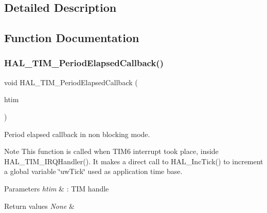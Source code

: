 \subsection{Detailed Description}


\subsection{Function Documentation}
\mbox{\label{group___t_i_m___exported___functions___group9_ga8a3b0ad512a6e6c6157440b68d395eac}} 
\subsubsection{\texorpdfstring{H\+A\+L\+\_\+\+T\+I\+M\+\_\+\+Period\+Elapsed\+Callback()}{HAL\_TIM\_PeriodElapsedCallback()}}
{\footnotesize\ttfamily void H\+A\+L\+\_\+\+T\+I\+M\+\_\+\+Period\+Elapsed\+Callback (\begin{DoxyParamCaption}\item[{\hyperlink{struct_t_i_m___handle_type_def}{T\+I\+M\+\_\+\+Handle\+Type\+Def} $\ast$}]{htim }\end{DoxyParamCaption})}



Period elapsed callback in non blocking mode. 

\begin{DoxyNote}{Note}
This function is called when T\+I\+M6 interrupt took place, inside H\+A\+L\+\_\+\+T\+I\+M\+\_\+\+I\+R\+Q\+Handler(). It makes a direct call to H\+A\+L\+\_\+\+Inc\+Tick() to increment a global variable \char`\"{}uw\+Tick\char`\"{} used as application time base. 
\end{DoxyNote}

\begin{DoxyParams}{Parameters}
{\em htim} & \+: T\+IM handle \\
\hline
\end{DoxyParams}

\begin{DoxyRetVals}{Return values}
{\em None} & \\
\hline
\end{DoxyRetVals}
